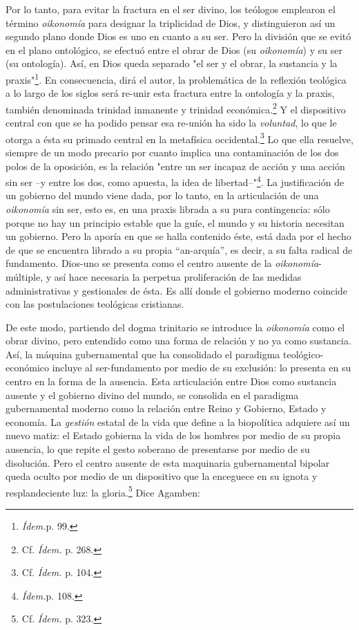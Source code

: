 \documentclass{book}
\begin{document}
Por lo tanto, para evitar la fractura en el ser divino, los teólogos
emplearon el término \emph{oikonomía} para designar la triplicidad de
Dios, y distinguieron así un segundo plano donde Dios es uno en cuanto a
su ser. Pero la división que se evitó en el plano ontológico, se efectuó
entre el obrar de Dios (su \emph{oikonomía}) y su ser (su ontología).
Así, en Dios queda separado "el ser y el obrar, la sustancia y la
praxis"\footnote{\emph{Ídem.}p. 99.}. En consecuencia, dirá el autor, la
problemática de la reflexión teológica a lo largo de los siglos será
re-unir esta fractura entre la ontología y la praxis, también denominada
trinidad inmanente y trinidad económica.\footnote{Cf. \emph{Ídem.} p.
  268.} Y el dispositivo central con que se ha podido pensar esa
re-unión ha sido la \emph{voluntad}, lo que le otorga a ésta su primado
central en la metafísica occidental.\footnote{Cf. \emph{Ídem.} p. 104.}
Lo que ella resuelve, siempre de un modo precario por cuanto implica una
contaminación de los dos polos de la oposición, es la relación "entre un
ser incapaz de acción y una acción sin ser --y entre los dos, como
apuesta, la idea de libertad--"\footnote{\emph{Ídem.}p. 108.}. La
justificación de un gobierno del mundo viene dada, por lo tanto, en la
articulación de una \emph{oikonomía} sin ser, esto es, en una praxis
librada a su pura contingencia: sólo porque no hay un principio estable
que la guíe, el mundo y su historia necesitan un gobierno. Pero la
aporía en que se halla contenido éste, está dada por el hecho de que se
encuentra librado a su propia ``an-arquía'', es decir, a su falta
radical de fundamento. Dios-uno se presenta como el centro ausente de la
\emph{oikonomía}-múltiple, y así hace necesaria la perpetua
proliferación de las medidas administrativas y gestionales de ésta. Es
allí donde el gobierno moderno coincide con las postulaciones teológicas
cristianas.

De este modo, partiendo del dogma trinitario se introduce la
\emph{oikonomía} como el obrar divino, pero entendido como una forma de
relación y no ya como sustancia. Así, la máquina gubernamental que ha
consolidado el paradigma teológico-económico incluye al ser-fundamento
por medio de su exclusión: lo presenta en su centro en la forma de la
ausencia. Esta articulación entre Dios como sustancia ausente y el
gobierno divino del mundo, se consolida en el paradigma gubernamental
moderno como la relación entre Reino y Gobierno, Estado y economía. La
\emph{gestión} estatal de la vida que define a la biopolítica adquiere
así un nuevo matiz: el Estado gobierna la vida de los hombres por medio
de su propia ausencia, lo que repite el gesto soberano de presentarse
por medio de su disolución. Pero el centro ausente de esta maquinaria
gubernamental bipolar queda oculto por medio de un dispositivo que la
enceguece en su ignota y resplandeciente luz: la gloria.\footnote{Cf.
  \emph{Ídem.} p. 323.} Dice Agamben:
\end{document}
